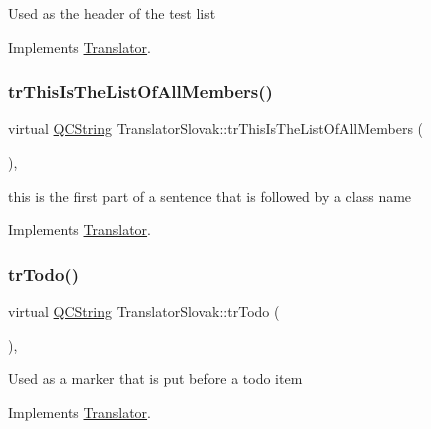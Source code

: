 Used as the header of the test list 

Implements \mbox{\hyperlink{class_translator}{Translator}}.

\mbox{\label{class_translator_slovak_a09138485fb6268a3d7d92030decdb9fd}} 
\subsubsection{\texorpdfstring{trThisIsTheListOfAllMembers()}{trThisIsTheListOfAllMembers()}}
{\footnotesize\ttfamily virtual \mbox{\hyperlink{class_q_c_string}{Q\+C\+String}} Translator\+Slovak\+::tr\+This\+Is\+The\+List\+Of\+All\+Members (\begin{DoxyParamCaption}{ }\end{DoxyParamCaption})\hspace{0.3cm}{\ttfamily [inline]}, {\ttfamily [virtual]}}

this is the first part of a sentence that is followed by a class name 

Implements \mbox{\hyperlink{class_translator}{Translator}}.

\mbox{\label{class_translator_slovak_a6ea87554759a5cbc85d67c09906c6b98}} 
\subsubsection{\texorpdfstring{trTodo()}{trTodo()}}
{\footnotesize\ttfamily virtual \mbox{\hyperlink{class_q_c_string}{Q\+C\+String}} Translator\+Slovak\+::tr\+Todo (\begin{DoxyParamCaption}{ }\end{DoxyParamCaption})\hspace{0.3cm}{\ttfamily [inline]}, {\ttfamily [virtual]}}

Used as a marker that is put before a todo item 

Implements \mbox{\hyperlink{class_translator}{Translator}}.

\mbox{\label{class_translator_slovak_af3c9a9c23b9f464e9a5fe5a0fb92a2b7}} 
